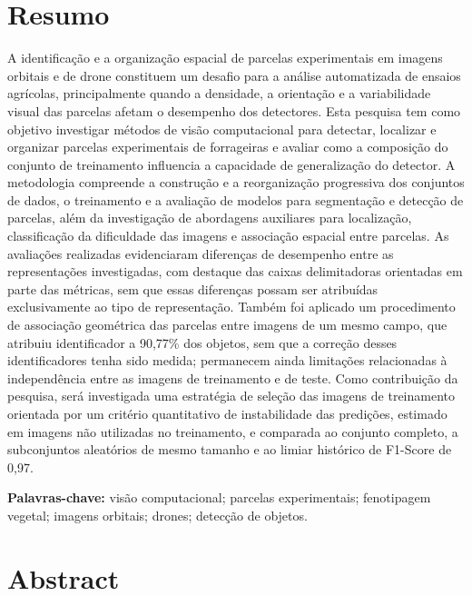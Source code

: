 \chapter*{Resumo}

A identifica\c{c}\~ao e a organiza\c{c}\~ao espacial de parcelas experimentais em imagens orbitais e de drone constituem um desafio para a an\'alise automatizada de ensaios agr\'icolas, principalmente quando a densidade, a orienta\c{c}\~ao e a variabilidade visual das parcelas afetam o desempenho dos detectores. Esta pesquisa tem como objetivo investigar m\'etodos de vis\~ao computacional para detectar, localizar e organizar parcelas experimentais de forrageiras e avaliar como a composi\c{c}\~ao do conjunto de treinamento influencia a capacidade de generaliza\c{c}\~ao do detector. A metodologia compreende a constru\c{c}\~ao e a reorganiza\c{c}\~ao progressiva dos conjuntos de dados, o treinamento e a avalia\c{c}\~ao de modelos para segmenta\c{c}\~ao e detec\c{c}\~ao de parcelas, al\'em da investiga\c{c}\~ao de abordagens auxiliares para localiza\c{c}\~ao, classifica\c{c}\~ao da dificuldade das imagens e associa\c{c}\~ao espacial entre parcelas. As avalia\c{c}\~oes realizadas evidenciaram diferen\c{c}as de desempenho entre as representa\c{c}\~oes investigadas, com destaque das caixas delimitadoras orientadas em parte das m\'etricas, sem que essas diferen\c{c}as possam ser atribu\'idas exclusivamente ao tipo de representa\c{c}\~ao. Tamb\'em foi aplicado um procedimento de associa\c{c}\~ao geom\'etrica das parcelas entre imagens de um mesmo campo, que atribuiu identificador a 90,77\% dos objetos, sem que a corre\c{c}\~ao desses identificadores tenha sido medida; permanecem ainda limita\c{c}\~oes relacionadas \`{a} independ\^encia entre as imagens de treinamento e de teste. Como contribui\c{c}\~ao da pesquisa, ser\'a investigada uma estrat\'egia de sele\c{c}\~ao das imagens de treinamento orientada por um crit\'erio quantitativo de instabilidade das predi\c{c}\~oes, estimado em imagens n\~ao utilizadas no treinamento, e comparada ao conjunto completo, a subconjuntos aleat\'orios de mesmo tamanho e ao limiar hist\'orico de F1-Score de 0,97.

\textbf{Palavras-chave:} vis\~ao computacional; parcelas experimentais; fenotipagem vegetal; imagens orbitais; drones; detec\c{c}\~ao de objetos.

\chapter*{Abstract}

